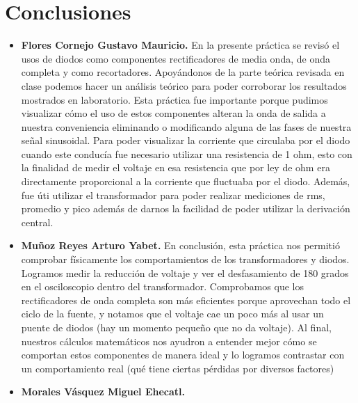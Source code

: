 \documentclass[journal]{IEEEtran}
\begin{document}
\section{Conclusiones}
\begin{itemize}
    \item \textbf{Flores Cornejo Gustavo Mauricio.}
    \newline En la presente práctica se revisó el usos de diodos como componentes rectificadores de media onda, de onda completa y como recortadores. Apoyándonos de la parte teórica revisada en clase podemos hacer un análisis teórico para poder corroborar los resultados 
    mostrados en laboratorio. Esta práctica fue importante porque pudimos visualizar cómo el uso de estos componentes alteran la onda de salida a nuestra conveniencia eliminando o modificando alguna de las fases de nuestra señal sinusoidal. Para poder visualizar la corriente que circulaba por el diodo cuando
    este conducía fue necesario utilizar una resistencia de 1 ohm, esto con la finalidad de medir el voltaje en esa resistencia que por ley de ohm era directamente proporcional a la corriente que fluctuaba por el diodo.
    Además, fue úti utilizar el transformador para poder realizar mediciones de rms, promedio y pico además de darnos la facilidad de poder utilizar la derivación central.
    \newline 
    \item \textbf{Muñoz Reyes Arturo Yabet.}
    \newline En conclusión, esta práctica nos permitió comprobar físicamente los comportamientos de los transformadores y diodos. Logramos medir la reducción de voltaje y ver el desfasamiento de 180 grados en el osciloscopio dentro del transformador. Comprobamos que los rectificadores de onda completa son más eficientes porque aprovechan todo el ciclo de la fuente, y notamos que el voltaje cae un poco más al usar un puente de diodos (hay un momento pequeño que no da voltaje). Al final, nuestros cálculos matemáticos nos ayudron a entender mejor cómo se comportan estos componentes de manera ideal y lo logramos contrastar con un comportamiento real (qué tiene ciertas pérdidas por diversos factores)
    \newline 
    \item \textbf{Morales Vásquez Miguel Ehecatl.} 

\end{itemize}
\end{document}
